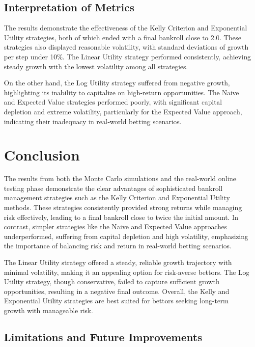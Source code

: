 \subsection{Interpretation of Metrics}

The results demonstrate the effectiveness of the Kelly Criterion and Exponential Utility strategies, both of which ended with a final bankroll close to 2.0. These strategies also displayed reasonable volatility, with standard deviations of growth per step under 10\%. The Linear Utility strategy performed consistently, achieving steady growth with the lowest volatility among all strategies.

On the other hand, the Log Utility strategy suffered from negative growth, highlighting its inability to capitalize on high-return opportunities. The Naive and Expected Value strategies performed poorly, with significant capital depletion and extreme volatility, particularly for the Expected Value approach, indicating their inadequacy in real-world betting scenarios.


\section{Conclusion}

The results from both the Monte Carlo simulations and the real-world online testing phase demonstrate the clear advantages of sophisticated bankroll management strategies such as the Kelly Criterion and Exponential Utility methods. These strategies consistently provided strong returns while managing risk effectively, leading to a final bankroll close to twice the initial amount. In contrast, simpler strategies like the Naive and Expected Value approaches underperformed, suffering from capital depletion and high volatility, emphasizing the importance of balancing risk and return in real-world betting scenarios.

The Linear Utility strategy offered a steady, reliable growth trajectory with minimal volatility, making it an appealing option for risk-averse bettors. The Log Utility strategy, though conservative, failed to capture sufficient growth opportunities, resulting in a negative final outcome. Overall, the Kelly and Exponential Utility strategies are best suited for bettors seeking long-term growth with manageable risk.

\subsection{Limitations and Future Improvements}

